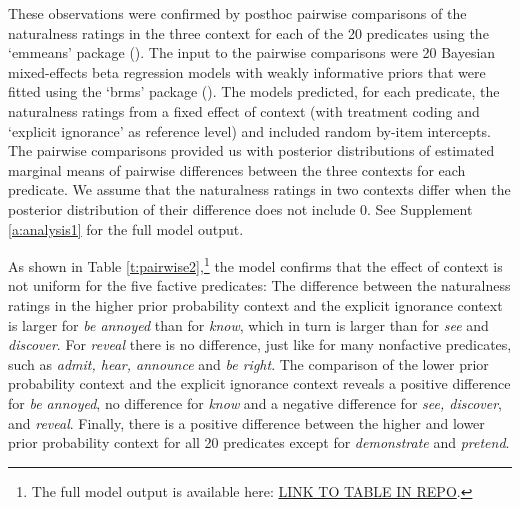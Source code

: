 \documentclass[11pt,fleqn]{article}
\newcommand{\6}{\mbox{$[\hspace*{-.6mm}[$}}
\newcommand{\9}{\mbox{$]\hspace*{-.6mm}]$}}
\begin{document}
These observations were confirmed by posthoc pairwise comparisons of the naturalness ratings in the three context for each of the 20 predicates using the `emmeans' package (\citealt{emmeans}). The input to the pairwise comparisons were 20 Bayesian mixed-effects beta regression models with weakly informative priors that were fitted using the `brms' package (\citealt{buerkner2017}). The models predicted, for each predicate, the naturalness ratings from a fixed effect of context (with treatment coding and `explicit ignorance' as reference level) and included random by-item intercepts. The pairwise comparisons provided us with posterior distributions of estimated marginal means of pairwise differences between the three contexts for each predicate. We assume that the naturalness ratings in two contexts differ when the posterior distribution of their difference does not include 0. See Supplement \ref{a:analysis1} for the full model output.

 As shown in Table \ref{t:pairwise2},\footnote{The full model output is available here: \url{LINK TO TABLE IN REPO}.} the model confirms that the effect of context is not uniform for the five factive predicates: The difference between the naturalness ratings in the higher prior probability context and the explicit ignorance context is larger for {\em be annoyed} than for {\em know}, which in turn is larger than for {\em see} and {\em discover}. For {\em reveal} there is no difference, just like for many nonfactive predicates, such as {\em admit, hear, announce} and {\em be right}. The comparison of the lower prior probability context and the explicit ignorance context reveals a positive difference for {\em be annoyed}, no difference for {\em know} and a negative difference for {\em see, discover}, and {\em reveal}. Finally, there is a positive difference between the higher and lower prior probability context for all 20 predicates except for {\em demonstrate} and {\em pretend}.
 
\end{document}
